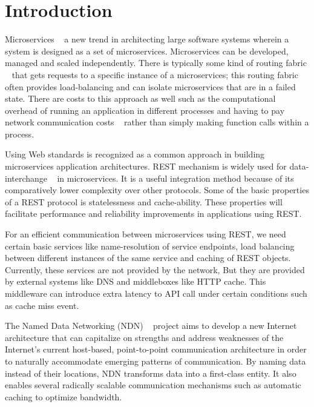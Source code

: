 \section{Introduction}
\label{intro}

Microservices ~\cite{DBLP:journals/corr/DragoniGLMMMS16} a new trend in architecting large software systems wherein a system is designed as a set of microservices. Microservices can be developed, managed and scaled independently. There is typically some kind of routing fabric ~\cite{Selimi:2017:PSP:3101112.3101167} that gets requests to a specific instance of a microservices; this routing fabric often provides load-balancing and can isolate microservices that are in a failed state. There are costs to this approach as well such as the computational overhead of running an application in different processes and having to pay network communication costs ~\cite{7742218} rather than simply making function calls within a process.

Using Web standards is recognized as a common approach in building microservices application architectures. REST mechanism is widely used for data-interchange ~\cite{DBLP:journals/corr/DragoniGLMMMS16} in microservices. It is a useful integration method because of its comparatively lower complexity over other protocols. Some of the basic properties of a REST protocol is statelessness and cache-ability. These properties will facilitate performance and reliability improvements in applications using REST.

For an efficient communication between microservices using REST, we need certain basic services like name-resolution of service endpoints, load balancing between different instances of the same service and caching of REST objects. Currently, these services are not provided by the network, But they are provided by external systems like DNS and middleboxes like HTTP cache. This middleware can introduce extra latency to API call under certain conditions such as cache miss event.  

The Named Data Networking (NDN) ~\cite{zhang2014named} project aims to develop a new Internet architecture that can capitalize on strengths and address weaknesses of the Internet’s current host-based, point-to-point communication architecture in order to naturally accommodate emerging patterns of communication. By naming data instead of their locations, NDN transforms data into a first-class entity. It also enables several radically scalable communication mechanisms such as automatic caching to optimize bandwidth.

